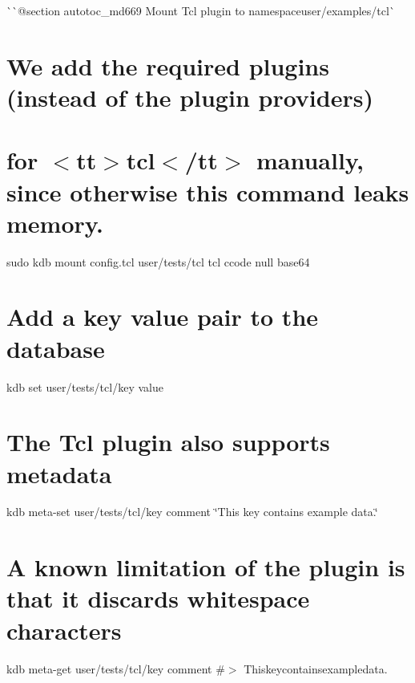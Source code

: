 \`{}\`{}{\ttfamily  @section autotoc\+\_\+md669 Mount Tcl plugin to namespace}user/examples/tcl\`{} \hypertarget{autotoc_md666_autotoc_md670}{}\section{We add the required plugins (instead of the plugin providers)}\label{autotoc_md666_autotoc_md670}
\hypertarget{autotoc_md666_autotoc_md671}{}\section{for $<$tt$>$tcl$<$/tt$>$ manually, since otherwise this command leaks memory.}\label{autotoc_md666_autotoc_md671}
sudo kdb mount config.\+tcl user/tests/tcl tcl ccode null base64\hypertarget{autotoc_md666_autotoc_md672}{}\section{Add a key value pair to the database}\label{autotoc_md666_autotoc_md672}
kdb set user/tests/tcl/key value \hypertarget{autotoc_md666_autotoc_md673}{}\section{The Tcl plugin also supports metadata}\label{autotoc_md666_autotoc_md673}
kdb meta-\/set user/tests/tcl/key comment \char`\"{}\+This key contains example data.\char`\"{} \hypertarget{autotoc_md666_autotoc_md674}{}\section{A known limitation of the plugin is that it discards whitespace characters}\label{autotoc_md666_autotoc_md674}
kdb meta-\/get user/tests/tcl/key comment \#$>$ Thiskeycontainsexampledata.

